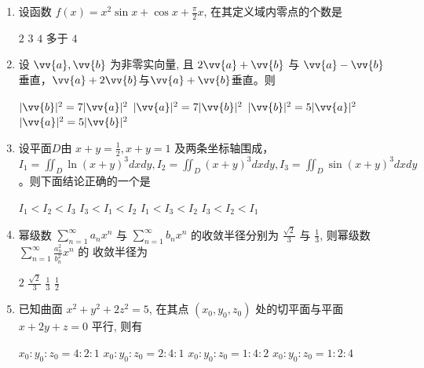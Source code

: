 \begin{enumerate}
\begin{enumerate}
\item
设函数 $f(x)=x^{2} \sin x+\cos x+\frac{\pi}{2} x$, 在其定义域内零点的个数是 


\fourchoices
{$ 2 $}
{$ 3 $}
{$ 4 $}
{多于 $ 4 $}

\item
设 $ \vv{a} ,  \vv{b} $ 为非零实向量, 且 $2  \vv{a} + \vv{b} $ 与 $ \vv{a} - \vv{b} $ 垂直，$  \vv{a}+2 \vv{b}   $与$  \vv{a} +  \vv{b}  $垂直。则 


\fourchoices
{$| \vv{b} |^{2}=7| \vv{a} |^{2}$}
{$| \vv{a} |^{2}=7| \vv{b} |^{2}$}
{$| \vv{b} |^{2}=5| \vv{a} |^{2}$}
{$| \vv{a} |^{2}=5| \vv{b} |^{2}$}

\item
设平面$ D $由 $x+y=\frac{1}{2}, x+y=1$ 及两条坐标轴围成， $I_{1}=\iint_{D} \ln (x+y)^{3} d x d y, I_{2}=\iint_{D}(x+y)^{3} d x d y, I_{3}=\iint_{D} \sin (x+y)^{3} d x d y$ 。则下面结论正确的一个是 


\fourchoices
{$I_{1}<I_{2}<I_{3}$}
{$I_{3}<I_{1}<I_{2}$}
{$I_{1}<I_{3}<I_{2}$}
{$I_{3}<I_{2}<I_{1}$}


\item
幂级数 $\sum\limits_{n=1}^{\infty} a_{n} x^{n}$ 与 $\sum\limits_{n=1}^{\infty} b_{n} x^{n}$ 的收敛半径分别为 $\frac{\sqrt{2}}{3}$ 与 $\frac{1}{3}$, 则幂级数 $\sum\limits_{n=1}^{\infty} \frac{a_{n}^{2}}{b_{n}^{2}} x^{n}$ 的 收敛半径为 


\fourchoices
{$ 2 $}
{$\frac{\sqrt{2}}{3}$}
{$\frac{1}{3}$}
{$\frac{1}{2}$}


\item
已知曲面 $x^{2}+y^{2}+2 z^{2}=5$, 在其点 $\left(x_{0}, y_{0}, z_{0}\right)$ 处的切平面与平面 $x+2 y+z=0$ 平行, 则有 


\fourchoices
{$x_{0}: y_{0}: z_{0}=4: 2: 1$}
{$x_{0}: y_{0}: z_{0}=2: 4: 1$}
{$x_{0}: y_{0}: z_{0}=1: 4: 2$}
{$x_{0}: y_{0}: z_{0}=1: 2: 4$}





	\end{enumerate}


\end{enumerate}
